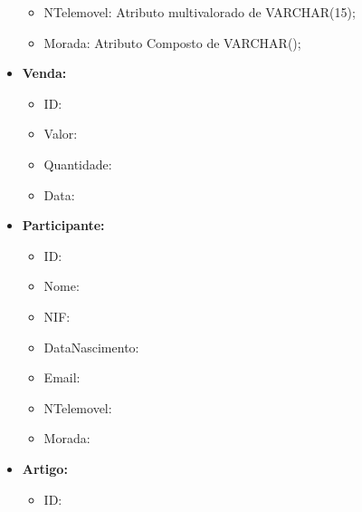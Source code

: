 \documentclass[a4paper,12pt]{scrreprt}
\begin{document}
\begin{itemize}
\begin{itemize}
                     \item{NTelemovel:} Atributo multivalorado de VARCHAR(15);
                       
                     \item{Morada:} Atributo Composto de VARCHAR();
                       
                     \end{itemize}
                 \item{\textbf{Venda:}}
                     \begin{itemize}
                     \item{ID:}
                       
                     \item{Valor:}
                       
                     \item{Quantidade:}
                       
                     \item{Data:}
                       
                     \end{itemize}
                 \item{\textbf{Participante:}}
                     \begin{itemize}
                     \item{ID:}
                       
                     \item{Nome:}
                       
                     \item{NIF:}
                       
                     \item{DataNascimento:}
                       
                     \item{Email:}
                       
                     \item{NTelemovel:}
                       
                     \item{Morada:}
                       
                     \end{itemize}
                 \item{\textbf{Artigo:}}
                     \begin{itemize}
                     \item{ID:}
                       

\end{itemize}
\end{itemize}
\end{document}
